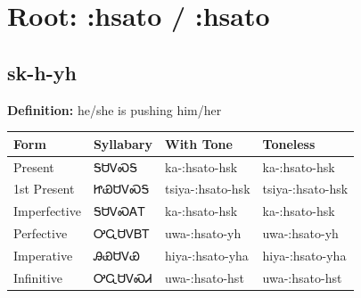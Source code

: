 \documentclass{article}%
\begin{document}
%
\normalsize%
\section*{Root: :hsato / :hsato}%
\subsection*{sk-h-yh}%
\textbf{Definition: }%
he/she is pushing him/her%
\\[0.5em]%
\begin{tabular}{|l|l|l|l|}%
\hline%
\textbf{Form}&\textbf{Syllabary}&\textbf{With Tone}&\textbf{Toneless}\\%
\hline%
Present&ᎦᏌᏙᏍᎦ&ka{-}:hsato{-}hsk&ka{-}:hsato{-}hsk\\%
1st Present&ᏥᏯᏌᏙᏍᎦ&tsiya{-}:hsato{-}hsk&tsiya{-}:hsato{-}hsk\\%
Imperfective&ᎦᏌᏙᏍᎪᎢ&ka{-}:hsato{-}hsk&ka{-}:hsato{-}hsk\\%
Perfective&ᎤᏩᏌᏙᏴᎢ&uwa{-}:hsato{-}yh&uwa{-}:hsato{-}yh\\%
Imperative&ᎯᏯᏌᏙᏯ&hiya{-}:hsato{-}yha&hiya{-}:hsato{-}yha\\%
Infinitive&ᎤᏩᏌᏙᏍᏗ&uwa{-}:hsato{-}hst&uwa{-}:hsato{-}hst\\%
\hline%
\end{tabular}%
\\[1em]%
\end{document}
